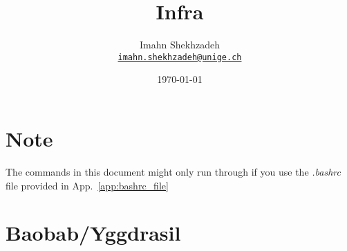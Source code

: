 \documentclass[12pt, a4paper]{article}
\title{Infra}
\author{Imahn Shekhzadeh \\ \texttt{\href{mailto:email@example.com}{imahn.shekhzadeh@unige.ch}}\normalsize}
\date{\today}
\numberwithin{equation}{section}
\theoremstyle{definition}
\theoremstyle{definition}
\begin{document}
	\maketitle 
	\tableofcontents
	
	\section*{\large Note}
	
	The commands in this document might only run through if you use the \textit{.bashrc} file provided in App.~\ref{app:bashrc_file}
	
	\newpage
	
	\section{Baobab/Yggdrasil}
	
\end{document}
